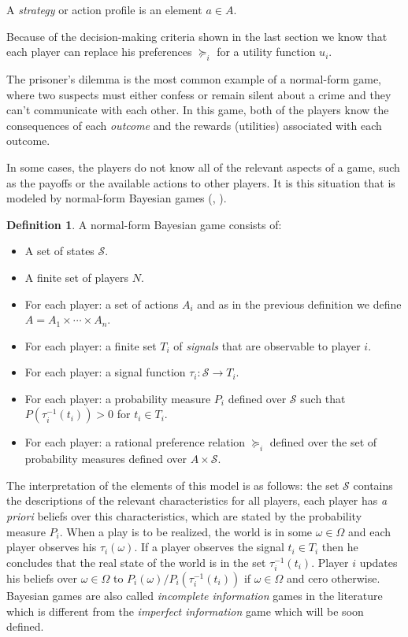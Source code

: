 \documentclass[english,letterpaper,12pt,final]{article}
\theoremstyle{definition}
\newtheorem{defi}{Definition}[section]
\begin{document}
A \textit{strategy} or action profile is an element $a \in A$.

Because of the decision-making criteria shown in the last section we know that each player can replace his preferences $\succeq_i$ for a utility function $u_i$.

The prisoner's dilemma is the most common example of a normal-form game, where two suspects must either confess or remain silent about a crime and they can't communicate with each other. In this game, both of the players know the consequences of each \textit{outcome} and the rewards (utilities) associated with each outcome.

In some cases, the players do not know all of the relevant aspects of a game, such as the payoffs or the available actions to other players. It is this situation that is modeled by normal-form Bayesian games (\cite{osborne1994course}, \cite{shoham2008multiagent}).

\begin{defi}
A normal-form Bayesian game consists of:
\begin{itemize}
\item A set of states $\mathcal{S}$.
\item A finite set of players $N$.
\item For each player: a set of actions $A_i$ and as in the previous definition we define $A= A_1 \times \cdots \times A_n$.
\item For each player: a finite set $T_i$ of \textit{signals} that are observable to player $i$.
\item For each player: a signal function $\tau_i : \mathcal{S} \to T_i$.
\item For each player: a probability measure $P_i$ defined over $\mathcal{S}$ such that $P(\tau^{-1}_i (t_i)) >0$ for $t_i \in T_i$.
\item For each player: a rational preference relation $\succeq_i$ defined over the set of probability measures defined over $A \times \mathcal{S}$.
\end{itemize}
\end{defi}

The interpretation of the elements of this model is as follows: the set $\mathcal{S}$ contains the descriptions of the relevant characteristics for all players, each player has \textit{a priori} beliefs over this characteristics, which are stated by the probability measure $P_i$. When a play is to be realized, the world is in some $\omega \in \Omega$ and each player observes his $\tau_i (\omega)$. If a player observes the signal $t_i \in T_i$ then he concludes that the real state of the world is in the set $\tau^{-1}_i (t_i)$. Player $i$ updates his beliefs over $\omega \in \Omega$ to $P_i(\omega) / P_i(\tau^{-1}_i (t_i))$ if $\omega \in \Omega$ and cero otherwise. Bayesian games are also called \textit{incomplete information} games in the literature which is different from the \textit{imperfect information} game which will be soon defined.
\end{document}
